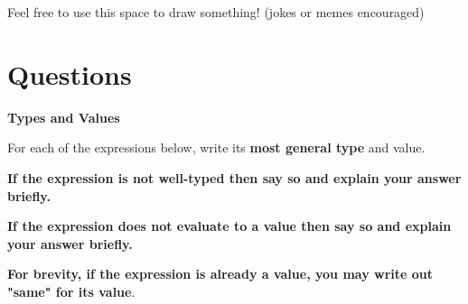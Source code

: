 \documentclass[addpoints,12pt, answers]{exam}
\begin{document}
\begin{center}
  Feel free to use this space to draw something! (jokes or memes encouraged)

  \vspace{10pt}

  \fbox{\rule{6in}{0pt}\rule[-0.5ex]{0pt}{2.5in}}
\end{center}


\newpage


\section*{Questions}

\begin{questions}

\textbf{Types and Values}

For each of the expressions below, write its \textbf{most general type} and value.

\textbf{If the expression is not well-typed then say so and explain your answer briefly.}

\textbf{If the expression does not evaluate to a value then say so and explain your answer briefly.}

\textbf{For brevity, if the expression is already a value, you may write out "same" for its value}.

\end{questions}
\end{document}
